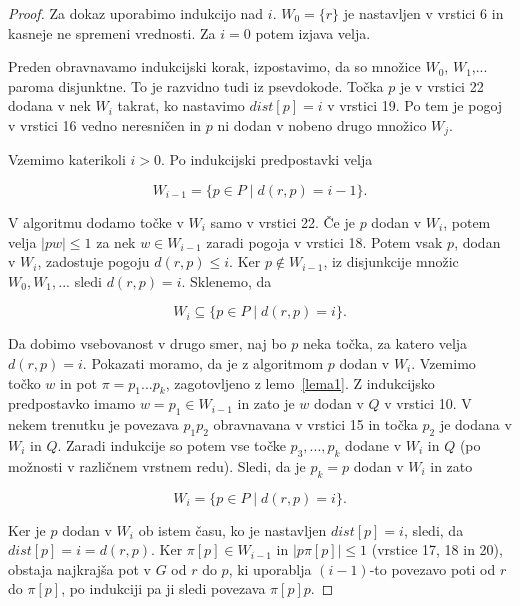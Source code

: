 \documentclass[a4paper, 12pt]{book}
\begin{document}
\begin{proof}
Za dokaz uporabimo indukcijo nad $i$. $W_0 = \{r\}$ je nastavljen v vrstici 6 in kasneje ne spremeni vrednosti. Za $i = 0$ potem izjava velja.

Preden obravnavamo indukcijski korak, izpostavimo, da so množice $W_0$, $W_1$,... paroma disjunktne. To je razvidno tudi iz psevdokode. Točka $p$  je v vrstici 22 dodana v nek $W_i$ takrat, ko nastavimo $dist[p] = i$ v vrstici 19. Po tem je pogoj v vrstici 16 vedno neresničen in $p$ ni dodan v nobeno drugo množico $W_j$.

Vzemimo katerikoli $i > 0$. Po indukcijski predpostavki velja

\begin{equation*}
W_{i-1} = \{p \in P \mid d(r,p) = i - 1\}.
\end{equation*}

V algoritmu dodamo točke v $W_i$ samo v vrstici 22. Če je $p$ dodan v $W_i$, potem velja $|pw| \leq 1$ za nek $w \in W_{i-1}$ zaradi pogoja v vrstici 18. Potem vsak $p$, dodan v $W_i$, zadostuje pogoju $d(r,p) \leq i$. Ker $p \notin W_{i-1}$, iz disjunkcije množic $W_0, W_1,...$ sledi $d(r,p) = i$. Sklenemo, da

\begin{equation*}
W_i \subseteq \{p \in P \mid d(r,p) = i\}.
\end{equation*}

Da dobimo vsebovanost v drugo smer, naj bo $p$ neka točka, za katero velja $d(r,p) = i$. Pokazati moramo, da je z algoritmom $p$ dodan v $W_i$. Vzemimo točko $w$ in pot $\pi = p_1...p_k$, zagotovljeno z lemo~\ref{lema1}. Z indukcijsko predpostavko imamo $w = p_1 \in W_{i-1}$ in zato je $w$ dodan v $Q$ v vrstici 10. V nekem trenutku je povezava $p_1p_2$ obravnavana v vrstici 15 in točka $p_2$ je dodana v $W_i$ in $Q$. Zaradi indukcije so potem vse točke $p_3,...,p_k$ dodane v $W_i$ in $Q$ (po možnosti v različnem vrstnem redu). Sledi, da je $p_k = p$ dodan v $W_i$ in zato

\begin{equation*}
W_i = \{p \in P \mid d(r,p) = i \}.
\end{equation*}

Ker je $p$ dodan v $W_i$ ob istem času, ko je nastavljen $dist[p] = i$, sledi, da $dist[p] = i = d(r,p)$. Ker $\pi[p] \in W_{i-1}$ in $|p\pi[p] | \leq 1$ (vrstice 17, 18 in 20), obstaja najkrajša pot v $G$ od $r$ do $p$, ki uporablja $(i-1)$-to povezavo poti od $r$ do $\pi[p]$, po indukciji pa ji sledi povezava $\pi[p]p$.
\end{proof}
\end{document}

